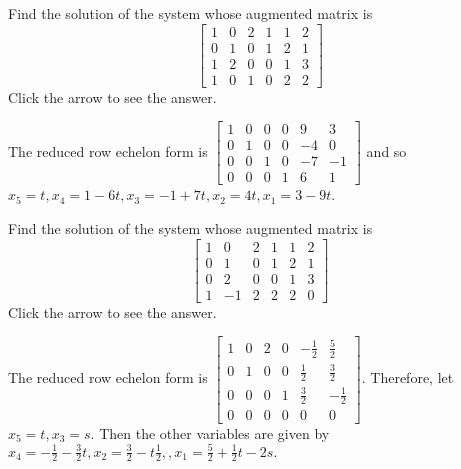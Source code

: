\documentclass{ximera}
\begin{document}
\begin{problem}\label{prb:2.28} Find the solution of the system whose augmented matrix is
\begin{equation*}
\left[
\begin{array}{rrrrr|r}
1 & 0 & 2 & 1 & 1 & 2 \\
0 & 1 & 0 & 1 & 2 & 1 \\
1 & 2 & 0 & 0 & 1 & 3 \\
1 & 0 & 1 & 0 & 2 & 2
\end{array}
\right]
\end{equation*}
Click the arrow to see the answer. 
\begin{expandable}
The reduced row echelon form is $\left[
\begin{array}{rrrrr|r}
1 & 0 & 0 & 0 & 9 & 3 \\
0 & 1 & 0 & 0 & -4 & 0 \\
0 & 0 & 1 & 0 & -7 & -1 \\
0 & 0 & 0 & 1 & 6 & 1
\end{array}
\right] $ and so $x_{5}=t,x_{4}=1-6t,x_{3}=-1+7t,x_{2}=4t,x_{1}=3-9t$.
\end{expandable}
\end{problem}

\begin{problem}\label{prb:2.29} Find the solution of the system whose augmented matrix is
\begin{equation*}
\left[
\begin{array}{rrrrr|r}
1 & 0 & 2 & 1 & 1 & 2 \\
0 & 1 & 0 & 1 & 2 & 1 \\
0 & 2 & 0 & 0 & 1 & 3 \\
1 & -1 & 2 & 2 & 2 & 0
\end{array}
\right]
\end{equation*}
Click the arrow to see the answer. 
\begin{expandable}
The reduced row echelon form is $\left[
\begin{array}{rrrrr|r}
1 & 0 & 2 & 0 & - \frac{1}{2} &  \frac{5}{2} \\
0 & 1 & 0 & 0 &  \frac{1}{2} &  \frac{3}{2} \\
0 & 0 & 0 & 1 &  \frac{3}{2} & - \frac{1}{2} \\
0 & 0 & 0 & 0 & 0 & 0
\end{array}
\right] $. Therefore, let $x_{5}=t,x_{3}=s.$ Then the other variables are
given by $x_{4}=-\frac{1}{2}-\frac{3}{2}t,x_{2}=\frac{3}{2}-t\frac{1}{2}
,,x_{1}=\frac{5}{2}+\frac{1}{2}t-2s.$
\end{expandable}
\end{problem}
\end{document}
